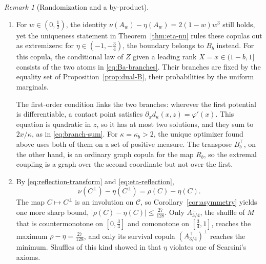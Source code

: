 \documentclass[11pt,a4paper]{article}
\theoremstyle{remark}
\newtheorem{remark}[theorem]{Remark}
\newcommand{\1}{\mathbf{1}}
\newcommand{\CC}{\mathcal{C}}
\begin{document}
\begin{remark}[Randomization and a by-product]
\label{rem:randomization}
\leavevmode
\begin{enumerate}[label=(\alph*),leftmargin=2em]
\item
For $w\in(0,\frac12)$, the identity $\nu(A_w)-\eta(A_w)=2(1-w)w^3$ still holds, yet the uniqueness statement in Theorem~\ref{thm:eta-nu} rules these copulas out as extremizers: for $\eta\in(-1,-\frac34)$, the boundary belongs to $B_b$ instead.
For this copula, the conditional law of $Z$ given a leading rank $X=x\in(1-b,1]$ consists of the two atoms in \eqref{eq:Ba-branches}.
Their branches are fixed by the equality set of Proposition~\ref{prop:dual-B}, their probabilities by the uniform marginals.

The first-order condition links the two branches: wherever the first potential is differentiable, a contact point satisfies $\partial_xd_\kappa(x,z)=\varphi'(x)$.
This equation is quadratic in $z$, so it has at most two solutions, and they sum to $2x/\kappa$, as in \eqref{eq:branch-sum}.
For $\kappa=\kappa_b>2$, the unique optimizer found above uses both of them on a set of positive measure.
The transpose $B_b^\top$, on the other hand, is an ordinary graph copula for the map $R_b$, so the extremal coupling is a graph over the second coordinate but not over the first.
\item
By \eqref{eq:reflection-transform} and \eqref{eq:eta-reflection},
\[
  \nu(C^\perp)-\eta(C^\perp)=\rho(C)-\eta(C).
\]
The map $C\mapsto C^\perp$ is an involution on $\CC$, so Corollary~\ref{cor:asymmetry} yields one more sharp bound, $|\rho(C)-\eta(C)|\le\frac{27}{128}$.
Only $A_{3/4}^\perp$, the shuffle of $M$ that is countermonotone on $[0,\frac34]$ and comonotone on $[\frac34,1]$, reaches the maximum $\rho-\eta=\frac{27}{128}$, and only its survival copula $(A_{3/4}^\top)^\perp$ reaches the minimum.
Shuffles of this kind showed in \cite[Ex.~4]{genest2003blest} that $\eta$ violates one of Scarsini's axioms.
\end{enumerate}
\end{remark}



\end{document}
